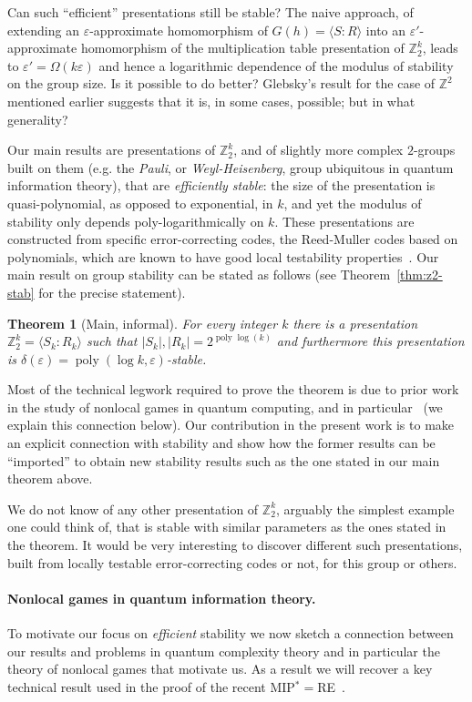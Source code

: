 \documentclass[11pt]{article}
\newtheorem{theorem*}{Theorem}
\theoremstyle{definition}
\newcommand{\Z}{\ensuremath{\mathbb{Z}}}
\DeclareMathOperator{\poly}{poly}
\newcommand{\eps}{\varepsilon}
\begin{document}
Can such ``efficient'' presentations still be stable? The naive approach, of extending an $\eps$-approximate homomorphism of $G(h)=\langle S:R\rangle$ into an $\eps'$-approximate homomorphism of the multiplication table presentation of $\Z_2^k$, leads to $\eps'=\Omega(k\eps)$ and hence a logarithmic dependence of the modulus of stability on the group size. Is it possible to do better? Glebsky's result for the case of $\Z^2$  mentioned earlier suggests that it is, in some cases, possible; but in what generality?  

Our main results are presentations of $\Z_2^k$, and of slightly more complex $2$-groups built on them (e.g. the \emph{Pauli}, or \emph{Weyl-Heisenberg}, group ubiquitous in quantum information theory), that are \emph{efficiently stable}: the size of the presentation is quasi-polynomial, as opposed to exponential, in $k$, and yet the modulus of stability only depends poly-logarithmically on $k$. These presentations are constructed from specific error-correcting codes, the Reed-Muller codes based on polynomials, which are known to have good local testability properties~\cite{babai1991non}. Our main result on group stability can be stated as follows (see Theorem~\ref{thm:z2-stab} for the precise statement).

\begin{theorem*}[Main, informal]
For every integer $k$ there is a presentation $\Z_2^k = \langle S_k:R_k\rangle$ such that $|S_k|,|R_k| = 2^{\poly\log(k)}$ and furthermore this presentation is $\delta(\eps)=\poly(\log k,\eps)$-stable. 
\end{theorem*}

Most of the technical legwork required to prove the theorem is due to prior work in the study of nonlocal games in quantum computing, and in particular~\cite{ji2020quantum} (we explain this connection below). Our contribution in the present work is to make an explicit connection with stability and show how the former results can be ``imported'' to obtain new stability results such as the one stated in our main theorem above. 

We do not know of any other presentation of $\Z_2^k$, arguably the simplest example one could think of, that is stable with similar parameters as the ones stated in the theorem. It would be very interesting to discover different such presentations, built from locally testable error-correcting codes or not, for this group or others. 

\paragraph{Nonlocal games in quantum information theory.}
To motivate our focus on \emph{efficient} stability we now sketch a connection between our results and problems in quantum complexity theory and in particular the theory of nonlocal games that motivate us. As a result we will recover a key technical result used in the proof of the recent MIP$^*=$RE~\cite{ji2020mip}. 
\end{document}
